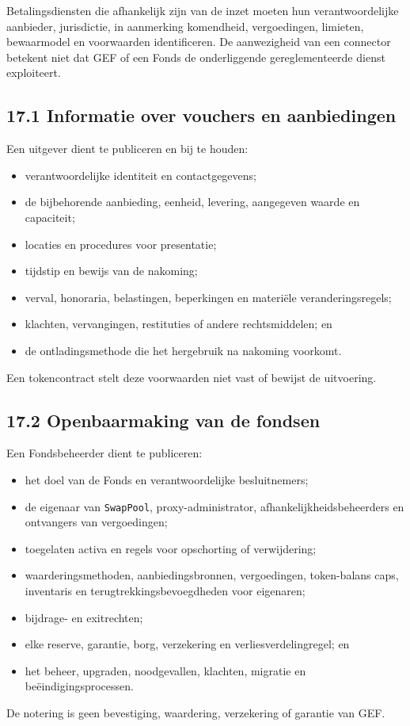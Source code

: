 \documentclass[11pt]{article}
\begin{document}
Betalingsdiensten die afhankelijk zijn van de inzet moeten hun verantwoordelijke aanbieder, jurisdictie, in aanmerking komendheid, vergoedingen, limieten, bewaarmodel en voorwaarden identificeren. De aanwezigheid van een connector betekent niet dat GEF of een Fonds de onderliggende gereglementeerde dienst exploiteert.

\subsection*{17.1 Informatie over vouchers en aanbiedingen}

Een uitgever dient te publiceren en bij te houden:

\begin{itemize}[leftmargin=*]
\item verantwoordelijke identiteit en contactgegevens;
\item de bijbehorende aanbieding, eenheid, levering, aangegeven waarde en capaciteit;
\item locaties en procedures voor presentatie;
\item tijdstip en bewijs van de nakoming;
\item verval, honoraria, belastingen, beperkingen en materiële veranderingsregels;
\item klachten, vervangingen, restituties of andere rechtsmiddelen; en
\item de ontladingsmethode die het hergebruik na nakoming voorkomt.
\end{itemize}
Een tokencontract stelt deze voorwaarden niet vast of bewijst de uitvoering.

\subsection*{17.2 Openbaarmaking van de fondsen}

Een Fondsbeheerder dient te publiceren:

\begin{itemize}[leftmargin=*]
\item het doel van de Fonds en verantwoordelijke besluitnemers;
\item de eigenaar van \texttt{SwapPool}, proxy-administrator, afhankelijkheidsbeheerders en ontvangers van vergoedingen;
\item toegelaten activa en regels voor opschorting of verwijdering;
\item waarderingsmethoden, aanbiedingsbronnen, vergoedingen, token-balans caps, inventaris en terugtrekkingsbevoegdheden voor eigenaren;
\item bijdrage- en exitrechten;
\item elke reserve, garantie, borg, verzekering en verliesverdelingregel; en
\item het beheer, upgraden, noodgevallen, klachten, migratie en beëindigingsprocessen.
\end{itemize}
De notering is geen bevestiging, waardering, verzekering of garantie van GEF.
\end{document}

